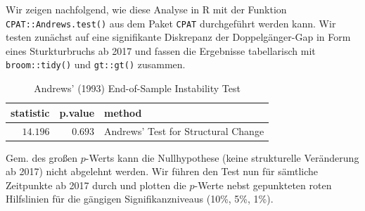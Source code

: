 \documentclass[
  a4paper,
  DIV=11,
  oneside]{scrreprt}
\newenvironment{Shaded}{\begin{snugshade}}{\end{snugshade}}
\newcommand{\AttributeTok}[1]{\textcolor[rgb]{0.40,0.45,0.13}{#1}}
\newcommand{\CommentTok}[1]{\textcolor[rgb]{0.37,0.37,0.37}{#1}}
\newcommand{\DecValTok}[1]{\textcolor[rgb]{0.68,0.00,0.00}{#1}}
\newcommand{\FunctionTok}[1]{\textcolor[rgb]{0.28,0.35,0.67}{#1}}
\newcommand{\NormalTok}[1]{\textcolor[rgb]{0.00,0.23,0.31}{#1}}
\newcommand{\SpecialCharTok}[1]{\textcolor[rgb]{0.37,0.37,0.37}{#1}}
\begin{document}
Wir zeigen nachfolgend, wie diese Analyse in R mit der Funktion
\texttt{CPAT::Andrews.test()} aus dem Paket \texttt{CPAT} durchgeführt
werden kann. Wir testen zunächst auf eine signifikante Diskrepanz der
Doppelgänger-Gap in Form eines Sturkturbruchs ab 2017 und fassen die
Ergebnisse tabellarisch mit \texttt{broom::tidy()} und \texttt{gt::gt()}
zusammen.

\begin{Shaded}
\end{Shaded}

\begin{longtable}{rrl}

\caption{\label{tbl-growthpdssek}Andrews' (1993) End-of-Sample
Instability Test}

\tabularnewline

\toprule
statistic & p.value & method \\ 
\midrule\addlinespace[2.5pt]
$14.196$ & $0.693$ & Andrews' Test for Structural Change \\ 
\bottomrule

\end{longtable}

Gem. des großen \(p\)-Werts kann die Nullhypothese (keine strukturelle
Veränderung ab 2017) nicht abgelehnt werden. Wir führen den Test nun für
sämtliche Zeitpunkte ab 2017 durch und plotten die \(p\)-Werte nebst
gepunkteten roten Hilfslinien für die gängigen Signifikanzniveaus (10\%,
5\%, 1\%).
\end{document}
